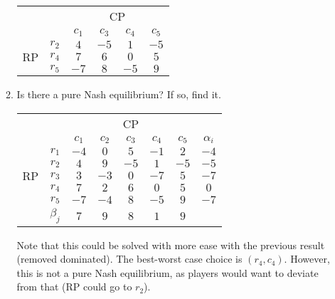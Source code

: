 \documentclass[a4paper, 12pt]{article}
\begin{document}
\begin{enumerate}[1.]
\begin{enumerate}[1.]
\begin{center}
\begin{tabular}{|cc|cccc|}
                                        \hline
                                        & & \multicolumn{4}{c|}{CP} \\
                                        & & $c_1$ & $c_3$ & $c_4$ & $c_5$ \\
                                        \hline
                                        \multirow{3}{*}{RP} & $r_2$ & $4$ & $-5$ & $1$ & $-5$ \\
                                        & $r_4$ & $7$ & $6$ & $0$ & $5$ \\
                                        & $r_5$ & $-7$ & $8$ & $-5$ & $9$ \\
                                        \hline
                                    \end{tabular}
                                \end{center}
                            \item
                                Is there a pure Nash equilibrium?
                                If so, find it.
                                \begin{center}
                                    \begin{tabular}{|cc|ccccc|c|}
                                        \hline
                                        & & \multicolumn{5}{c|}{CP} & \\
                                        & & $c_1$ & $c_2$ & $c_3$ & $c_4$ & $c_5$ & $\alpha_i$ \\
                                        \hline
                                        \multirow{5}{*}{RP} & $r_1$ & $-4$ & $0$ & $5$ & $-1$ & $2$ & $-4$ \\
                                        & $r_2$ & $4$ & $9$ & $-5$ & $1$ & $-5$ & $-5$ \\
                                        & $r_3$ & $3$ & $-3$ & $0$ & $-7$ & $5$ & $-7$ \\
                                        & $r_4$ & $7$ & $2$ & $6$ & $0$ & $5$ & $0$ \\
                                        & $r_5$ & $-7$ & $-4$ & $8$ & $-5$ & $9$ & $-7$ \\
                                        \hline
                                        & $\beta_j$ & $7$ & $9$ & $8$ & $1$ & $9$ & \\
                                        \hline
                                    \end{tabular}
                                \end{center}
                                Note that this could be solved with more ease with the previous result (removed dominated).
                                The best-worst case choice is $(r_4, c_4)$.
                                However, this is not a pure Nash equilibrium, as players would want to deviate from that (RP could go to $r_2$).
                        \end{enumerate}
                \end{enumerate}
\end{document}
